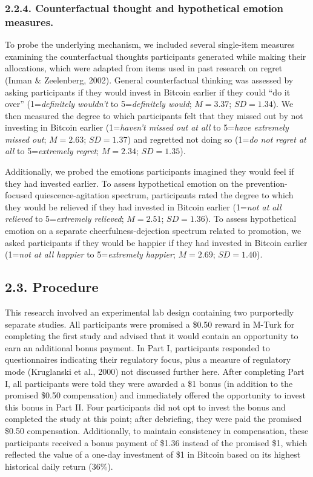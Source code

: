 \documentclass[man,floatsintext]{apa6}
\begin{document}
\hypertarget{counterfactual-thought-and-hypothetical-emotion-measures.}{%
\subsubsection{2.2.4. Counterfactual thought and hypothetical emotion measures.}\label{counterfactual-thought-and-hypothetical-emotion-measures.}}

To probe the underlying mechanism, we included several single-item measures examining the counterfactual thoughts participants generated while making their allocations, which were adapted from items used in past research on regret (Inman \& Zeelenberg, 2002). General counterfactual thinking was assessed by asking participants if they would invest in Bitcoin earlier if they could \enquote{do it over} (1=\emph{definitely wouldn't} to 5=\emph{definitely would}; \(M=3.37\); \(SD=1.34\)). We then measured the degree to which participants felt that they missed out by not investing in Bitcoin earlier (1=\emph{haven't missed out at all} to 5=\emph{have extremely missed out}; \(M=2.63\); \(SD=1.37\)) and regretted not doing so (1=\emph{do not regret at all} to 5=\emph{extremely regret}; \(M=2.34\); \(SD=1.35\)).

Additionally, we probed the emotions participants imagined they would feel if they had invested earlier. To assess hypothetical emotion on the prevention-focused quiescence-agitation spectrum, participants rated the degree to which they would be relieved if they had invested in Bitcoin earlier (1=\emph{not at all relieved} to 5=\emph{extremely relieved}; \(M=2.51\); \(SD=1.36\)). To assess hypothetical emotion on a separate cheerfulness-dejection spectrum related to promotion, we asked participants if they would be happier if they had invested in Bitcoin earlier (1=\emph{not at all happier} to 5=\emph{extremely happier}; \(M=2.69\); \(SD=1.40\)).

\hypertarget{procedure}{%
\subsection{2.3. Procedure}\label{procedure}}

This research involved an experimental lab design containing two purportedly separate studies. All participants were promised a \$0.50 reward in M-Turk for completing the first study and advised that it would contain an opportunity to earn an additional bonus payment. In Part I, participants responded to questionnaires indicating their regulatory focus, plus a measure of regulatory mode (Kruglanski et al., 2000) not discussed further here. After completing Part I, all participants were told they were awarded a \$1 bonus (in addition to the promised \$0.50 compensation) and immediately offered the opportunity to invest this bonus in Part II. Four participants did not opt to invest the bonus and completed the study at this point; after debriefing, they were paid the promised \$0.50 compensation. Additionally, to maintain consistency in compensation, these participants received a bonus payment of \$1.36 instead of the promised \$1, which reflected the value of a one-day investment of \$1 in Bitcoin based on its highest historical daily return (36\%).
\end{document}
